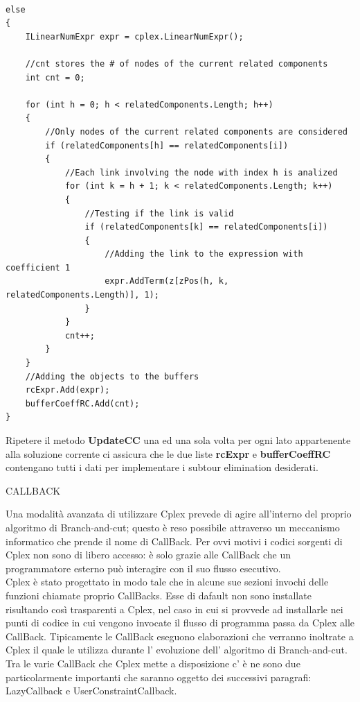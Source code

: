 \documentclass[11pt]{article}
\begin{document}
\begin{lstlisting}

else
{
	ILinearNumExpr expr = cplex.LinearNumExpr();

	//cnt stores the # of nodes of the current related components
	int cnt = 0;

	for (int h = 0; h < relatedComponents.Length; h++)
	{
		//Only nodes of the current related components are considered
		if (relatedComponents[h] == relatedComponents[i])
		{
			//Each link involving the node with index h is analized
			for (int k = h + 1; k < relatedComponents.Length; k++)
			{
				//Testing if the link is valid
				if (relatedComponents[k] == relatedComponents[i])
				{
					//Adding the link to the expression with coefficient 1
					expr.AddTerm(z[zPos(h, k, relatedComponents.Length)], 1);
				}
			}
			cnt++;
		}
	}
	//Adding the objects to the buffers
	rcExpr.Add(expr);
	bufferCoeffRC.Add(cnt);
}

\end{lstlisting}

Ripetere il metodo \textbf{UpdateCC} una ed una sola volta per ogni lato appartenente alla soluzione corrente ci assicura che le due liste \textbf{rcExpr} e \textbf{bufferCoeffRC} contengano tutti i dati per implementare i subtour elimination desiderati.

\vspace{2\baselineskip}
CALLBACK 
\vspace{2\baselineskip}

Una modalit\`a avanzata di utilizzare Cplex prevede di agire all'interno del proprio algoritmo di Branch-and-cut; questo \`e reso possibile attraverso un meccanismo informatico che prende il nome di CallBack. Per ovvi motivi i codici sorgenti di Cplex non sono di libero accesso: \`e solo grazie alle CallBack che un programmatore esterno pu\`o interagire con il suo flusso esecutivo.\\
Cplex \`e stato progettato in modo tale che in alcune sue sezioni invochi delle funzioni chiamate proprio CallBacks. Esse di dafault non sono installate risultando così trasparenti a Cplex, nel caso in cui si provvede ad installarle nei punti di codice in cui vengono invocate il flusso di programma passa da Cplex alle CallBack. Tipicamente le CallBack eseguono elaborazioni che verranno inoltrate a Cplex il quale le utilizza durante l' evoluzione dell' algoritmo di Branch-and-cut.
Tra le varie CallBack che Cplex mette a disposizione c' \`e  ne sono due particolarmente importanti che saranno oggetto dei successivi paragrafi: LazyCallback e UserConstraintCallback.
\end{document}
